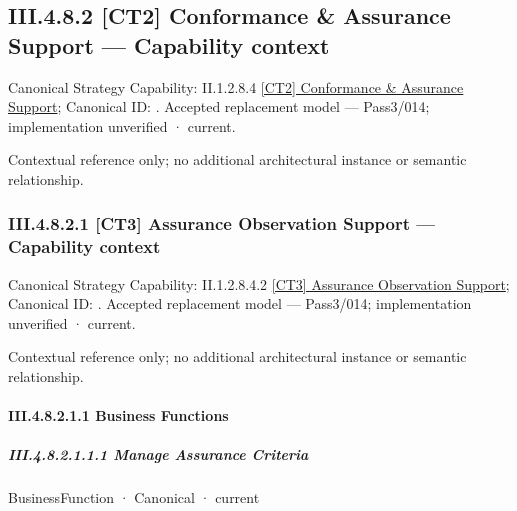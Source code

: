\subsection*{III.4.8.2 [CT2] Conformance \& Assurance Support — Capability context}
\label{navigation:III.4.8.2}

{\small Canonical Strategy Capability: II.1.2.8.4 \hyperref[element:131791faa80f408b8d566c601edd71be]{[CT2] Conformance \& Assurance Support}; Canonical ID: \texttt{}. Accepted replacement model — Pass3/014; implementation unverified · current.}\par
Contextual reference only; no additional architectural instance or semantic relationship.\par
\subsubsection*{III.4.8.2.1 [CT3] Assurance Observation Support — Capability context}
\label{navigation:III.4.8.2.1}

{\small Canonical Strategy Capability: II.1.2.8.4.2 \hyperref[element:48bb094dd2494228935c91551b149097]{[CT3] Assurance Observation Support}; Canonical ID: \texttt{}. Accepted replacement model — Pass3/014; implementation unverified · current.}\par
Contextual reference only; no additional architectural instance or semantic relationship.\par
\paragraph*{III.4.8.2.1.1 Business Functions}
\label{navigation:III.4.8.2.1.1}

\subparagraph*{III.4.8.2.1.1.1 Manage Assurance Criteria}
\label{navigation:III.4.8.2.1.1.1}

\label{element:d7e9ba5addd94db2bce164c7c9809e4e}
{\small BusinessFunction · Canonical · current}\par

